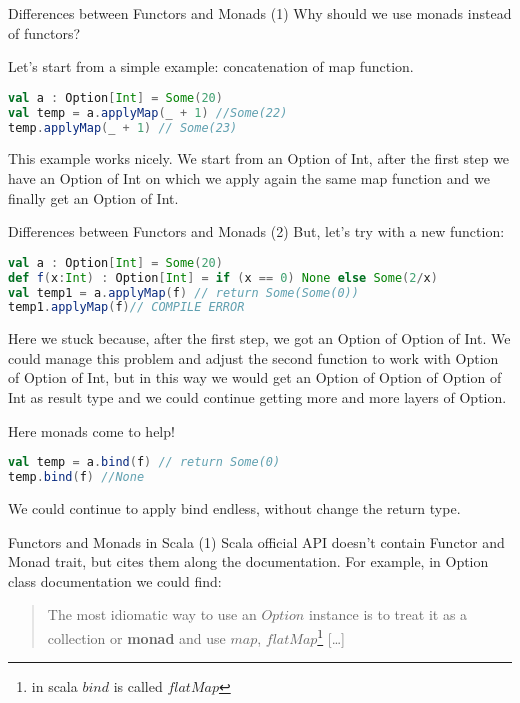 \begin{frame}[fragile]{Differences between Functors and Monads (1)}
	Why should we use monads instead of functors?
	
	Let's start from a simple example: concatenation of map function.
\begin{lstlisting}[language=scala]
val a : Option[Int] = Some(20)
val temp = a.applyMap(_ + 1) //Some(22)
temp.applyMap(_ + 1) // Some(23)
\end{lstlisting}				
	This example works nicely. We start from an Option of Int, after the first step we have an Option of Int on which we apply again 
	the same map function and we finally get an Option of Int.
\end{frame}

\begin{frame}[fragile]{Differences between Functors and Monads (2)}
	But, let's try with a new function:
\begin{lstlisting}[language=scala]
val a : Option[Int] = Some(20)		
def f(x:Int) : Option[Int] = if (x == 0) None else Some(2/x)
val temp1 = a.applyMap(f) // return Some(Some(0))
temp1.applyMap(f)// COMPILE ERROR
\end{lstlisting}	
	Here we stuck because, after the first step, we got an Option of Option of Int. 
	We could manage this problem and adjust the second function	to work with Option of Option of Int, 
	but in this way we would get an Option of Option of Option of Int as result type and we could continue getting more and more layers of Option.
	
	\pause
	
	Here monads come to help!
\begin{lstlisting}[language=scala]
val temp = a.bind(f) // return Some(0)
temp.bind(f) //None
\end{lstlisting}	
	We could continue to apply bind endless, without change the return type.
\end{frame}

\begin{frame}[fragile]{Functors and Monads in Scala (1)}
	Scala official API doesn't contain Functor and Monad trait, but cites them along the documentation.
	For example, in Option class documentation we could find:
	\begin{quotation}
		The most idiomatic way to use an $Option$ instance is to treat it as a collection or \textbf{monad} and use $map$, $flatMap$\footnote{in scala $bind$ is called $flatMap$} [\dots]
	\end{quotation}	
\end{frame}

